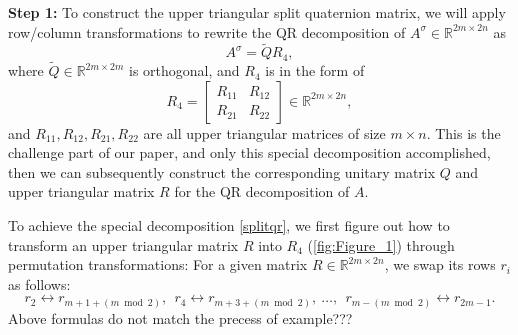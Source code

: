 \documentclass[12pt]{article}
\numberwithin{equation}{section}
\begin{document}
\noindent \textbf{Step 1:} To construct the upper triangular split quaternion matrix, we will apply row/column transformations to rewrite the QR decomposition of $A^\sigma \in \mathbb{R}^{2m \times 2n}$ as 
\begin{equation}\label{splitqr}
A^\sigma = \widetilde{Q} R_4,
\end{equation} 
where $\widetilde{Q} \in \mathbb{R}^{2m\times 2m}$ is orthogonal, and $R_4$ is in the form of 
\begin{equation}\label{r4}
R_4 = \begin{bmatrix}
    R_{11} & R_{12} \\
    R_{21} & R_{22}
\end{bmatrix} \in \mathbb{R}^{2m \times 2n},
\end{equation}
and $R_{11}, R_{12},R_{21},R_{22}$ are all upper triangular matrices of size $m \times n$. This is the challenge part of our paper, and only this special decomposition accomplished, then we can subsequently construct the corresponding unitary matrix \(Q\) and upper triangular matrix \(R\) for the QR decomposition of \(A\).

To achieve the special decomposition \eqref{splitqr}, we first figure out how to transform an upper triangular matrix $R$ into $R_4$ (\cref{fig:Figure_1}) through permutation transformations:
\iffalse
For a given matrix $R\in \mathbb{R}^{2m \times 2n}$, we swap its rows $r_i$ as follows: 
\begin{equation}\label{rowswap}
r_2\longleftrightarrow r_{m +1 + (m \bmod 2)}, \ \  r_4\longleftrightarrow r_{m+3+(m \bmod 2)}, \ \dots, \ \   r_{m - (m \bmod 2)}   \longleftrightarrow r_{2m-1}.
\end{equation}
{\color{red} Above formulas do not match the precess of example???}
\end{document}
